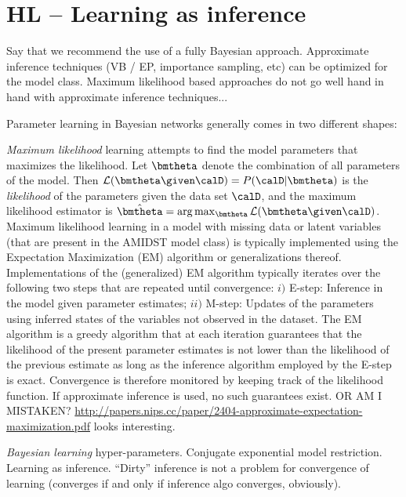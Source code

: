 

\section{HL -- Learning as inference} \label{sec:learningAsInference}


Say that we recommend the use of a fully Bayesian approach. Approximate inference techniques (VB / EP, importance sampling, etc) can be optimized for the model class. Maximum likelihood based approaches do not go well hand in hand with approximate inference techniques...

Parameter learning in Bayesian networks generally comes in two different shapes: 

\textit{Maximum likelihood} learning attempts to find the model parameters that maximizes the likelihood. Let $\bmtheta$ denote the combination of all parameters of the model. Then $\mathcal{L}(\bmtheta \given \calD) = P(\calD | \bmtheta)$ is the \textit{likelihood} of the parameters given the data set $\calD$, and the maximum likelihood estimator is $\hat{\bmtheta}=\arg\max_{\bmtheta} \mathcal{L}(\bmtheta \given \calD)$. Maximum likelihood learning in a model with missing data or latent variables (that are present in the AMIDST model class) is typically implemented using the Expectation Maximization (EM) algorithm or generalizations thereof. Implementations of the (generalized) EM algorithm typically iterates over the following two steps that are repeated until convergence: $i)$ E-step: Inference in the model given parameter estimates; $ii)$ M-step: Updates of the parameters using inferred states of the variables not observed in the dataset. The EM algorithm is a greedy algorithm that at each iteration guarantees that the likelihood of the present parameter estimates is not lower than the likelihood of the previous estimate as long as the inference algorithm employed by the E-step is exact. Convergence is therefore monitored by keeping track of the likelihood function. If approximate inference is used, no such guarantees exist.  OR AM I MISTAKEN? \url{http://papers.nips.cc/paper/2404-approximate-expectation-maximization.pdf} looks interesting.


\textit{Bayesian learning} hyper-parameters. Conjugate exponential model restriction. Learning as inference. ``Dirty'' inference is not a problem for convergence of learning (converges if and only if inference algo converges, obviously).
